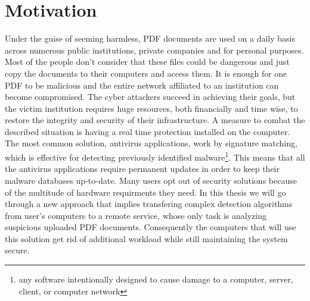 \section{Motivation}
\label{section:motivation}
Under the guise of seeming harmless, PDF documents are used on a daily basis across numerous public institutions, private companies and for personal purposes. Most of the people don't consider that these files could be dangerous and just copy the documents to their computers and access them. It is enough for one PDF to be malicious and the entire network affiliated to an institution can become compromised. The cyber attackers succeed in achieving their goals, but the victim institution requires huge resources, both financially and time wise, to restore the integrity and security of their infrastructure. A measure to combat the described situation is having a real time protection installed on the computer. The most common solution, antivirus applications, work by signature matching, which is effective for detecting previously identified malware\footnote{any software intentionally designed to cause damage to a computer, server, client, or computer network}. This means that all the antivirus applications require permanent updates in order to keep their malware databases up-to-date. Many users opt out of security solutions because of the multitude of hardware requirments they need. In this thesis we will go through a new approach that implies transfering complex detection algorithms from user's computers to a remote service, whose only task is analyzing suspicious uploaded PDF documents. Consequently the computers that will use this solution get rid of additional workload while still maintaining the system secure.


